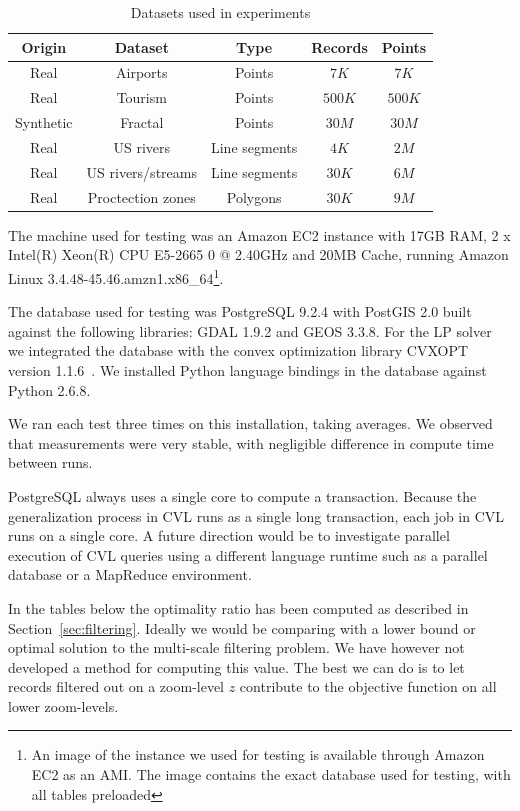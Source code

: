 \begin{table}[htdp]
\caption{Datasets used in experiments}
\label{tab:datasets}
\begin{center}
\begin{tabular}{|c|c|c|c|c|}
\hline
\textbf{Origin} & \textbf{Dataset} & \textbf{Type} & \textbf{Records} & \textbf{Points} \\
\hline
Real & Airports & Points & $7K$ & $7K$ \\
Real & Tourism & Points & $500K$ & $500K$ \\
Synthetic & Fractal & Points & $30M$ & $30M$ \\
Real & US rivers & Line segments & $4K$ & $2M$ \\
Real & US rivers/streams & Line segments & $30K$ & $6M$ \\
Real & Proctection zones & Polygons & $30K$ & $9M$ \\
\hline
\end{tabular}
\end{center}
\label{default}
\end{table}%


The machine used for testing was an Amazon EC2 instance with 17GB RAM, 2 x Intel(R) Xeon(R) CPU E5-2665 0 @ 2.40GHz and 20MB Cache, running Amazon Linux 3.4.48-45.46.amzn1.x86\_64\footnote{An image of the instance we used for testing is available through Amazon EC2 as an AMI. The image contains the exact database used for testing, with all tables preloaded}.

The database used for testing was PostgreSQL 9.2.4 with PostGIS  2.0 built against the following libraries: GDAL 1.9.2 and GEOS 3.3.8. For the LP solver we integrated the database with the convex optimization library CVXOPT version 1.1.6~\cite{cvxopt}. We installed Python language bindings in the database against Python 2.6.8.

We ran each test three times on this installation, taking averages. We observed that measurements were very stable, with negligible difference in compute time between runs.

PostgreSQL always uses a single core to compute a transaction. Because the generalization process in CVL runs as a single long transaction, each job in CVL runs on a single core. A future direction would be to investigate parallel execution of CVL queries using a different language runtime such as a parallel database or a MapReduce environment.

In the tables below the optimality ratio has been computed as described in Section~\ref{sec:filtering}. Ideally we would be comparing with a lower bound or optimal solution to the multi-scale filtering problem. We have however not developed a method for computing this value. The best we can do is to let records filtered out on a zoom-level $z$ contribute to the objective function on all lower zoom-levels.

